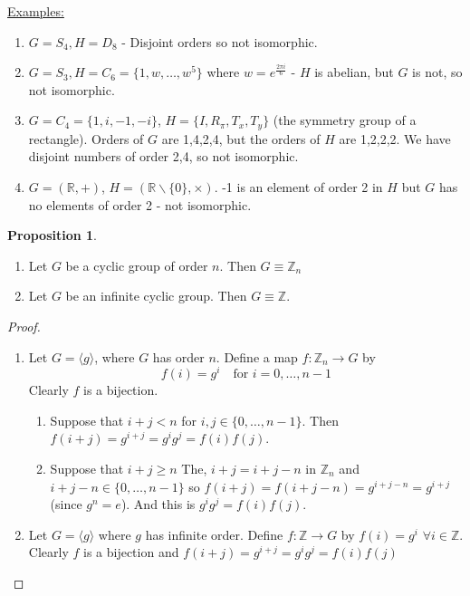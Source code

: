 \documentclass{article}
\theoremstyle{definition}
\newtheorem{proposition}{Proposition}
\begin{document}
\underline{Examples:}
\begin{enumerate}
  \item $G=S_4, H=D_8$ - Disjoint orders so not isomorphic.
  \item $G=S_3, H=C_6=\{1,w,\ldots,w^5\}$ where $w=e^{\frac{2 \pi i}{6}}$ - $H$ is abelian, but $G$ is not, so not isomorphic.
  \item $G=C_4=\{1,i,-1,-i\}$, $H=\{I,R_\pi,T_x,T_y\}$ (the symmetry group of a rectangle). Orders of $G$ are 1,4,2,4, but the orders of $H$ are 1,2,2,2. We have disjoint numbers of order 2,4, so not isomorphic.
  \item $G=(\mathbb{R}, +)$, $H=(\mathbb{R}\backslash\{0\}, \times).$ -1 is an element of order 2 in $H$ but $G$ has no elements of order 2 - not isomorphic.
\end{enumerate}

\begin{proposition}
  \begin{enumerate}
    \item Let $G$ be a cyclic group of order $n$. Then $G \equiv \mathbb{Z}_n$
    \item Let $G$ be an infinite cyclic group. Then $G \equiv \mathbb{Z}$.
  \end{enumerate}
\end{proposition}

\begin{proof}
  \begin{enumerate}
    \item Let $G=\langle g \rangle $, where $G$ has order $n$. Define a map $f : \mathbb{Z}_n \rightarrow G$ by 
      $$f(i)=g^i \quad \text{for } i=0,\ldots,n-1$$
    Clearly $f$ is a bijection.
    \begin{enumerate}
      \item Suppose that $i+j<n$ for $i,j \in \{0,\ldots,n-1\}.$ Then $f(i+j)=g^{i+j}=g^i g^j = f(i)f(j)$.
      \item Suppose that $i+j \geq n$ The, $i+j = i+j-n$ in $\mathbb{Z}_n$ and $i+j-n \in \{0,\ldots,n-1\}$ so $f(i+j)=f(i+j-n)=g^{i+j-n}=g^{i+j}$ (since $g^n=e$).
        And this is $g^i g^j = f(i) f(j)$.
    \end{enumerate}
  \item Let $G=\langle g \rangle$ where $g$ has infinite order. Define $f : \mathbb{Z} \rightarrow G$ by $f(i)=g^i$ $\forall i \in \mathbb{Z}$. Clearly $f$ is a bijection and $f(i+j)=g^{i+j}=g^i g^j = f(i) f(j)$
  \end{enumerate}
\end{proof}
\end{document}
